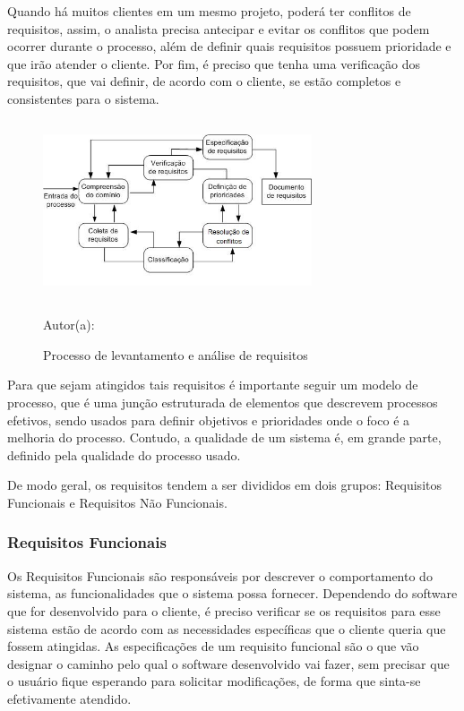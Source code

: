 Quando há muitos clientes em um mesmo projeto, poderá ter conflitos de requisitos, assim, o analista precisa antecipar e evitar os conflitos que podem ocorrer durante o processo, além de definir quais requisitos possuem prioridade e que irão atender o cliente. Por fim, é preciso que tenha uma verificação dos requisitos, que vai definir, de acordo com o cliente, se estão completos e consistentes para o sistema.

\begin{figure}[!h]
	\centering
	\caption{Processo de levantamento e análise de requisitos }
	\includegraphics[width=300px, height=200px]{./images/2-10.jpg}
		\par{Autor(a): \cite{sommerville}}
\end{figure}

Para que sejam atingidos tais requisitos é importante seguir um modelo de processo, que é uma junção estruturada de elementos que descrevem processos efetivos, sendo usados para definir objetivos e prioridades onde o foco é a melhoria do processo. Contudo, a qualidade de um sistema é, em grande parte, definido pela qualidade do processo usado.

De modo geral, os requisitos tendem a ser divididos em dois grupos: Requisitos Funcionais e Requisitos Não Funcionais.

\subsubsection{Requisitos Funcionais}

Os Requisitos Funcionais são responsáveis por descrever o comportamento do sistema, as funcionalidades que o sistema possa fornecer. Dependendo do software que for desenvolvido para o cliente, é preciso verificar se os requisitos para esse sistema estão de acordo com as necessidades específicas que o cliente queria que fossem atingidas. As especificações de um requisito funcional são o que vão designar o caminho pelo qual o software desenvolvido vai fazer, sem precisar que o usuário fique esperando para solicitar modificações, de forma que sinta-se efetivamente atendido.

